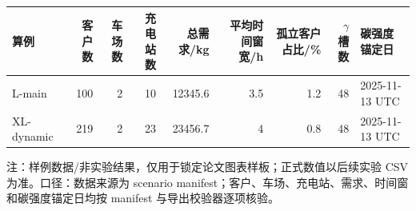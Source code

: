 \begin{tabular}{@{}lrrrrrrrl@{}}
\toprule
算例 & 客户数 & 车场数 & 充电站数 & 总需求/kg & 平均时间窗宽/h & 孤立客户占比/\% & $\gamma$槽数 & 碳强度锚定日\\
\midrule
L-main & 100 & 2 & 10 & 12345.6 & 3.5 & 1.2 & 48 & 2025-11-13 UTC\\
XL-dynamic & 219 & 2 & 23 & 23456.7 & 4 & 0.8 & 48 & 2025-11-13 UTC\\
\bottomrule
\end{tabular}
\par\footnotesize 注：样例数据/非实验结果，仅用于锁定论文图表样板；正式数值以后续实验 CSV 为准。口径：数据来源为 scenario manifest；客户、车场、充电站、需求、时间窗和碳强度锚定日均按 manifest 与导出校验器逐项核验。
